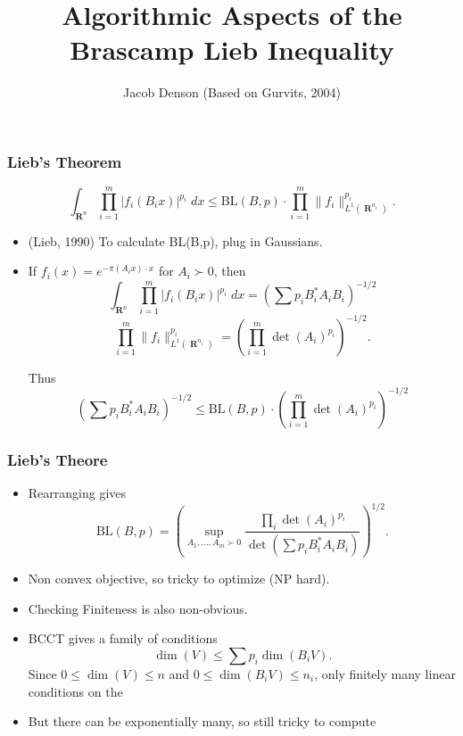 \documentclass[usenames,dvipsnames,12pt]{beamer}
\title{Algorithmic Aspects of the Brascamp Lieb Inequality}
\author{Jacob Denson (Based on Gurvits, 2004)}
\institute{University of Wisconsin Madison}
\DeclareMathOperator{\RR}{\mathbf{R}}
\begin{document}
\maketitle

\begin{frame}
    \frametitle{Lieb's Theorem}

    \vspace{-1em}
    \[ \int_{\RR^n} \prod_{i = 1}^m |f_i(B_i x)|^{p_i}\; dx \leq \text{BL}(B,p) \cdot \prod_{i=1}^m \| f_i \|_{L^1(\RR^{n_i})}^{p_i}.  \]

    \begin{itemize}
        \pause
        \item (Lieb, 1990) To calculate BL(B,p), plug in Gaussians.

        \pause
        \item If $f_i(x) = e^{- \pi (A_i x) \cdot x}$ for $A_i \succ 0$, then
        \pause
        \[ \int_{\RR^n} \prod_{i = 1}^m |f_i(B_i x)|^{p_i}\; dx = (\sum p_i B_i^* A_i B_i)^{-1/2} \]
        \pause
        \[ \prod_{i = 1}^m \| f_i \|_{L^1(\RR^{n_i})}^{p_i} = (\prod_{i = 1}^m \det(A_i)^{p_i})^{-1/2}. \]

        Thus
        \[ (\sum p_i B_i^* A_i B_i)^{-1/2} \leq \text{BL}(B,p) \cdot (\prod_{i = 1}^m \det(A_i)^{p_i})^{-1/2} \]

    \end{itemize}
\end{frame}

\begin{frame}
    \frametitle{Lieb's Theore}

    \begin{itemize}
        \item Rearranging gives
        \[ \text{BL}(B,p) = \left( \sup_{A_1,\dots,A_m \succ 0} \frac{\prod_i \det(A_i)^{p_i}}{\det(\sum p_i B_i^* A_i B_i)} \right)^{1/2}. \]

        \pause
        \item Non convex objective, so tricky to optimize (NP hard).

        \pause
        \item Checking Finiteness is also non-obvious.

        \pause
        \item BCCT gives a family of conditions
        \[ \dim(V) \leq \sum p_i \dim(B_i V). \]
        Since $0 \leq \dim(V) \leq n$ and $0 \leq \dim(B_i V) \leq n_i$, only finitely many linear conditions on the 
        \pause
        \item But there can be exponentially many, so still tricky to compute
    \end{itemize}
\end{frame}
\end{document}
